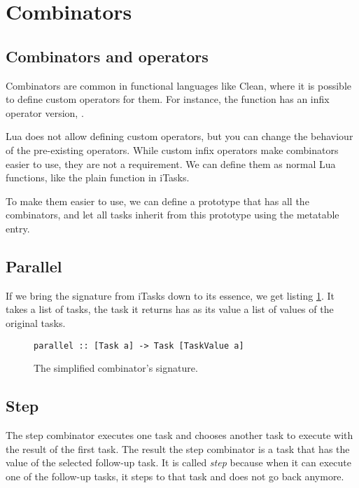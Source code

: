 \section{Combinators}\label{section-combinators}

\subsection{Combinators and operators}
Combinators are common in functional languages like Clean, where it is possible to define custom operators for them. For instance, the  function has an infix operator version, \clean{>>*}.

Lua does not allow defining custom operators, but you can change the behaviour of the pre-existing operators. While custom infix operators make combinators easier to use, they are not a requirement. We can define them as normal Lua functions, like the plain  function in iTasks.

To make them easier to use, we can define a  prototype that has all the combinators, and let all tasks inherit from this prototype using the  metatable entry.

\subsection{Parallel}
If we bring the  signature from iTasks down to its essence, we get listing \ref{lst:clean_parallel}. It takes a list of tasks, the task it returns has as its value a list of values of the original tasks.

\begin{figure}[ht]
\centering
\begin{verbatim}
parallel :: [Task a] -> Task [TaskValue a]
\end{verbatim}
\caption{The simplified  combinator's signature.}
\label{lst:clean_parallel}
\end{figure}

\subsection{Step}
The step combinator executes one task and chooses another task to execute with the result of the first task. The result the step combinator is a task that has the value of the selected follow-up task. It is called \textit{step} because when it can execute one of the follow-up tasks, it steps to that task and does not go back anymore.

